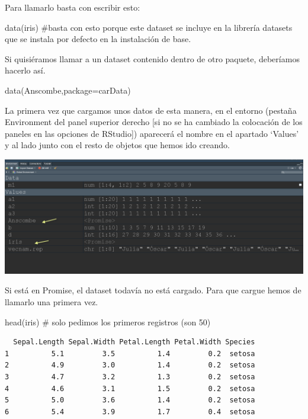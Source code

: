 \documentclass[
  letterpaper,
  DIV=11,
  numbers=noendperiod]{scrreprt}
\newenvironment{Shaded}{\begin{snugshade}}{\end{snugshade}}
\newcommand{\AttributeTok}[1]{\textcolor[rgb]{0.40,0.45,0.13}{#1}}
\newcommand{\CommentTok}[1]{\textcolor[rgb]{0.37,0.37,0.37}{#1}}
\newcommand{\FunctionTok}[1]{\textcolor[rgb]{0.28,0.35,0.67}{#1}}
\newcommand{\NormalTok}[1]{\textcolor[rgb]{0.00,0.23,0.31}{#1}}
\newcommand{\StringTok}[1]{\textcolor[rgb]{0.13,0.47,0.30}{#1}}
\begin{document}
Para llamarlo basta con escribir esto:

\begin{Shaded}
\begin{Highlighting}[]
\FunctionTok{data}\NormalTok{(iris) }\CommentTok{\#basta con esto porque este dataset se incluye en la librería datasets que se instala por defecto en la instalación de base.}
\end{Highlighting}
\end{Shaded}

Si quisiéramos llamar a un dataset contenido dentro de otro paquete,
deberíamos hacerlo así.

\begin{Shaded}
\begin{Highlighting}[]
\FunctionTok{data}\NormalTok{(Anscombe,}\AttributeTok{package=}\StringTok{\textquotesingle{}carData\textquotesingle{}}\NormalTok{) }
\end{Highlighting}
\end{Shaded}

La primera vez que cargamos unos datos de esta manera, en el entorno
(pestaña Environment del panel superior derecho {[}si no se ha cambiado
la colocación de los paneles en las opciones de RStudio{]}) aparecerá el
nombre en el apartado `Values' y al lado junto con el resto de objetos
que hemos ido creando.

\includegraphics{./pics/Promise.png}

Si está en Promise, el dataset todavía no está cargado. Para que cargue
hemos de llamarlo una primera vez.

\begin{Shaded}
\begin{Highlighting}[]
\FunctionTok{head}\NormalTok{(iris) }\CommentTok{\# solo pedimos los primeros registros (son 50)}
\end{Highlighting}
\end{Shaded}

\begin{verbatim}
  Sepal.Length Sepal.Width Petal.Length Petal.Width Species
1          5.1         3.5          1.4         0.2  setosa
2          4.9         3.0          1.4         0.2  setosa
3          4.7         3.2          1.3         0.2  setosa
4          4.6         3.1          1.5         0.2  setosa
5          5.0         3.6          1.4         0.2  setosa
6          5.4         3.9          1.7         0.4  setosa
\end{verbatim}
\end{document}
